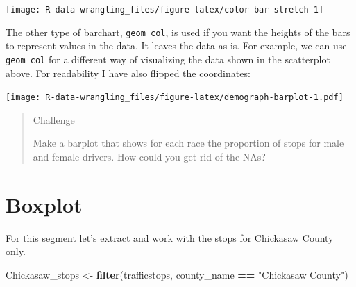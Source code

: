 \documentclass[]{book}
\newenvironment{Shaded}{\begin{snugshade}}{\end{snugshade}}
\newcommand{\KeywordTok}[1]{\textcolor[rgb]{0.13,0.29,0.53}{\textbf{#1}}}
\newcommand{\DataTypeTok}[1]{\textcolor[rgb]{0.13,0.29,0.53}{#1}}
\newcommand{\FloatTok}[1]{\textcolor[rgb]{0.00,0.00,0.81}{#1}}
\newcommand{\StringTok}[1]{\textcolor[rgb]{0.31,0.60,0.02}{#1}}
\newcommand{\OperatorTok}[1]{\textcolor[rgb]{0.81,0.36,0.00}{\textbf{#1}}}
\newcommand{\NormalTok}[1]{#1}
\theoremstyle{definition}
\theoremstyle{definition}
\theoremstyle{definition}
\theoremstyle{remark}
\begin{document}
\texttt{[image: R-data-wrangling\_files/figure-latex/color-bar-stretch-1]}

The other type of barchart, \texttt{geom\_col}, is used if you want the
heights of the bars to represent values in the data. It leaves the data
as is. For example, we can use \texttt{geom\_col} for a different way of
visualizing the data shown in the scatterplot above. For readability I
have also flipped the coordinates:

\begin{Shaded}
\end{Shaded}

\texttt{[image: R-data-wrangling\_files/figure-latex/demograph-barplot-1.pdf]}

\begin{quote}
Challenge

Make a barplot that shows for each race the proportion of stops for male
and female drivers. How could you get rid of the NAs?
\end{quote}

\section{Boxplot}\label{boxplot}

For this segment let's extract and work with the stops for Chickasaw
County only.

\begin{Shaded}
\begin{Highlighting}[]
\NormalTok{Chickasaw_stops <-}\StringTok{ }\KeywordTok{filter}\NormalTok{(trafficstops, county_name }\OperatorTok{==}\StringTok{ "Chickasaw County"}\NormalTok{)}
\end{Highlighting}
\end{Shaded}
\end{document}
